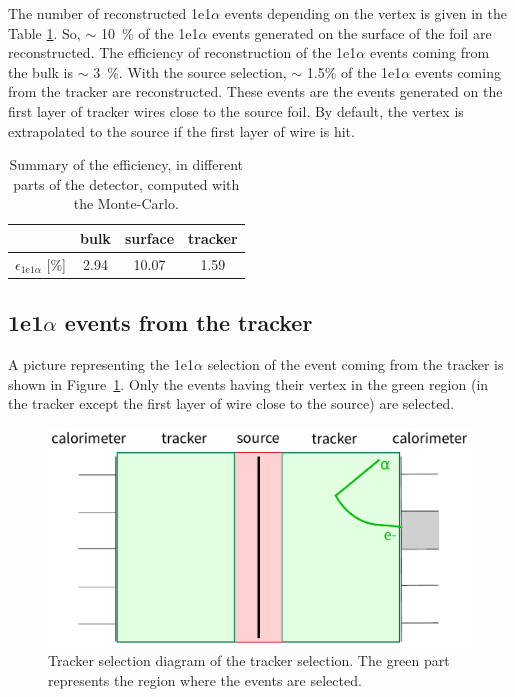 \documentclass[main.tex]{subfiles}
\begin{document}
\bigskip

\noindent The number of reconstructed 1e1$\alpha$ events depending on the vertex is given in the Table \ref{efficiency_different_parts_foil_source}. So, $\sim$ 10~\% of the 1e1$\alpha$ events generated on the surface of the foil are reconstructed. The efficiency of reconstruction of the 1e1$\alpha$ events coming from the bulk is $\sim$ 3~\%. With the source selection, $\sim$ 1.5\% of the 1e1$\alpha$ events coming from the tracker are reconstructed. These events are the events generated on the first layer of tracker wires close to the source foil. By default, the vertex is extrapolated to the source if the first layer of wire is hit.


\begin{table}[h!]
\begin{center}
\begin{tabular}{c|c|c|c}
           & bulk   & surface & tracker \\
\hline
$\epsilon_{\text{1e1}\alpha}$ [\%] & 2.94 & 10.07  & 1.59 \\
\hline
\end{tabular}
\end{center}
\caption{Summary of the efficiency, in different parts of the detector, computed with the Monte-Carlo.}
\label{efficiency_different_parts_foil_source}
\end{table}


\FloatBarrier


\subsection{1e1$\alpha$ events from the tracker}


\noindent A picture representing the 1e1$\alpha$ selection of the event coming from the tracker is shown in Figure~\ref{cartoon_tracker_selection}. Only the events having their vertex in the green region (in the tracker except the first layer of wire close to the source) are selected.

 
\begin{figure}[h!]
\begin{center}
\includegraphics[scale=0.6]{pictures/Chap5/cartoon_tracker_selection.pdf}
\caption{Tracker selection diagram of the tracker selection. The green part represents the region where the events are selected.}
\label{cartoon_tracker_selection}
\end{center}
\end{figure}
\end{document}
